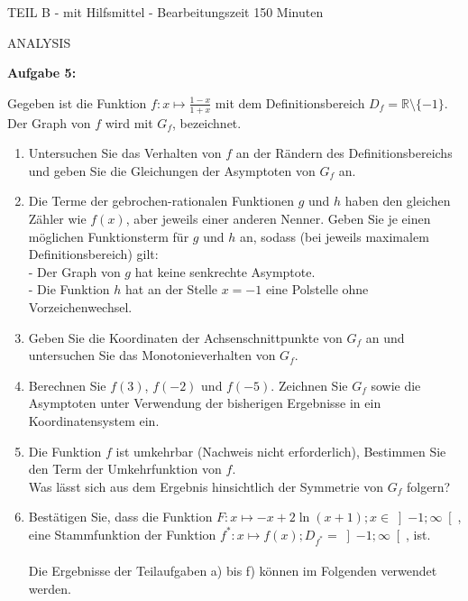 \documentclass[a4paper,12pt]{article}
\newcommand{\Aufgabe}[1]{
  {
  \vspace*{0.5cm}
  \textsf{\textbf{Aufgabe #1}}
  \vspace*{0.2cm}
  
  }
}
\begin{document}
\vspace {0,5cm}


\newpage


\begin{center}
\vspace{0,5cm} {TEIL B} - mit Hilfsmittel - Bearbeitungszeit 150 Minuten
\end{center}
\vspace {0,2cm}


\vspace {1,5cm}
ANALYSIS

\Aufgabe{5:}
Gegeben ist die Funktion $f: x\mapsto \frac{1-x}{1+x}$ mit dem Definitionsbereich $D_f = \mathbb{R}\setminus\{-1\}$. Der Graph von $f$ wird mit $G_f$, bezeichnet.

\begin{enumerate}[label={\alph*)}]
  \item Untersuchen Sie das Verhalten von $f$ an der Rändern des Definitionsbereichs und geben Sie die Gleichungen der Asymptoten von $G_f$ an.
  \item Die Terme der gebrochen-rationalen Funktionen $g$ und $h$ haben den gleichen Zähler wie $f(x)$, aber jeweils einer anderen Nenner. Geben Sie je einen möglichen Funktionsterm für $g$ und $h$ an, sodass (bei jeweils maximalem Definitionsbereich) gilt:\\
  - Der Graph von $g$ hat keine senkrechte Asymptote.\\
  - Die Funktion $h$ hat an der Stelle $x = -1$ eine Polstelle ohne Vorzeichenwechsel.
  \item Geben Sie die Koordinaten der Achsenschnittpunkte von $G_f$ an und untersuchen Sie das Monotonieverhalten von $G_f$. 
  \item Berechnen Sie $f(3)$, $f(-2)$ und $f(-5)$. Zeichnen Sie $G_f$ sowie die Asymptoten unter Verwendung der bisherigen Ergebnisse in ein Koordinatensystem ein.

  \item Die Funktion $f$ ist umkehrbar (Nachweis nicht erforderlich), Bestimmen Sie den Term der Umkehrfunktion von $f$.\\
  Was lässt sich aus dem Ergebnis hinsichtlich der Symmetrie von $G_f$ folgern?

\item Bestätigen Sie, dass die Funktion $F: x\mapsto -x+2 \ln (x + 1); x \in \left]-1; \infty \right[$, eine Stammfunktion der Funktion $f^*: x\mapsto f(x); D_{f^*}= \left]-1; \infty \right[$, ist. 
\\
\\
\newpage
    Die Ergebnisse der Teilaufgaben a) bis f) können im Folgenden verwendet werden.\\
\\


\end{enumerate}
\end{document}

